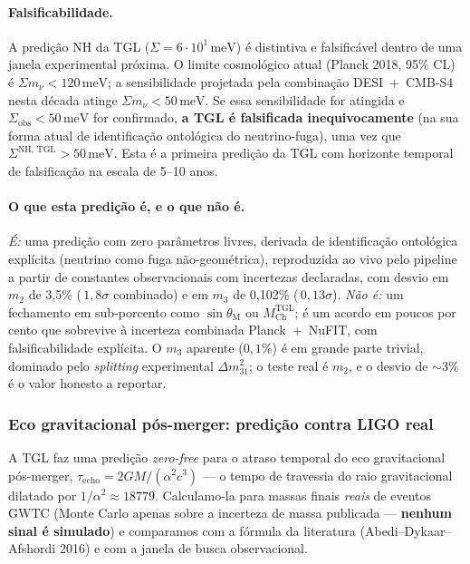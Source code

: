 \documentclass[12pt,a4paper]{article}
\newcommand{\thetaM}{\theta_{\text{M}}}
\newcommand{\TGL}{\textsc{TGL}}
\begin{document}
\paragraph{Falsificabilidade.}
A predição NH da \TGL{} ($\Sigma = 6 \cdot 10^{1}\,\mathrm{meV}$) é
distintiva e falsificável dentro de uma janela experimental próxima.  O
limite cosmológico atual (Planck 2018, 95\% CL) é
$\Sigma m_\nu < 120\,\mathrm{meV}$; a sensibilidade projetada pela
combinação DESI~+~CMB-S4 nesta década atinge $\Sigma m_\nu < 50\,\mathrm{meV}$.
Se essa sensibilidade for atingida e $\Sigma_{\text{obs}} < 50\,\mathrm{meV}$
for confirmado, \textbf{a \TGL{} é falsificada inequivocamente} (na sua
forma atual de identificação ontológica do neutrino-fuga), uma vez que
$\Sigma^{\text{NH, TGL}} > 50\,\mathrm{meV}$.  Esta é a primeira predição
da \TGL{} com horizonte temporal de falsificação na escala de 5--10 anos.

\paragraph{O que esta predição é, e o que não é.}
\emph{É:} uma predição com zero parâmetros livres, derivada de identificação
ontológica explícita (neutrino como fuga não-geométrica), reproduzida
ao vivo pelo pipeline a partir de constantes observacionais com incertezas
declaradas, com desvio em $m_2$ de 3{,}5\% (\,$1{,}8\sigma$ combinado) e em $m_3$ de 0{,}102\% (\,$0{,}13\sigma$).  \emph{Não é:} um
fechamento em sub-porcento como $\sin\thetaM$ ou $M_{\text{Ch}}^{\text{TGL}}$; é
um acordo em poucos por cento que sobrevive à incerteza combinada
Planck~+~NuFIT, com falsificabilidade explícita.  O $m_3$ aparente
($0{,}1\%$) é em grande parte trivial, dominado pelo \emph{splitting}
experimental $\Delta m^2_{31}$; o teste real é $m_2$, e o desvio de
$\sim 3\%$ é o valor honesto a reportar.


\subsubsection{Eco gravitacional pós-merger: predição contra LIGO real}
\label{sec:gw-echo}

A \TGL{} faz uma predição \emph{zero-free} para o atraso temporal do eco
gravitacional pós-merger, $\tau_{\text{echo}} = 2GM/(\alpha^{2}c^{3})$ --- o
tempo de travessia do raio gravitacional dilatado por $1/\alpha^{2} \approx
18779$.  Calculamo-la para massas finais
\emph{reais} de eventos GWTC (Monte Carlo apenas sobre a incerteza de massa
publicada --- \textbf{nenhum sinal é simulado}) e comparamos com a fórmula da
literatura (Abedi--Dykaar--Afshordi 2016) e com a janela de busca observacional.
\end{document}
